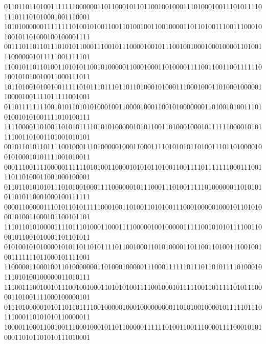 \documentclass[10pt,\tflang,dvips]{book}
\begin{document}
{{\begin{minipage}{\oldpwidth}
{{{{011011011010011111110000001101100010110110010010001110100010011101011110111011101010001001110001\\
101010000001111111101001010011001101001001100100001101101001110011100010100101101000100100001111\blue\\
001110110110111010101100011100101110000100101110010010001000100001101001110000001011111001111101\\
110010110110100110101011001010000011000100011010000111100110011001111110100101010010011000111011\blue\\
101101001010010011111010111011101101101000101000111000100011010001000001100001001111011111001001\\
011011111111001010110101010001001100001000110010100000001101001010011101010010101001111010100111\blue\\
111100001101001101010111101010100000101011001101000100010111111000010101111001101001101001010101\\
001011010110111100100011101000001000110001111010101011010011101101000010010100010101111001010011\blue\\
000111001111000001111110101001100001010101101001100111101111111000111001110110100011001000100001\\
011011010101011101010010001111000000101110001110100111110100000011010101011010110001000100111111\blue\\
000011000001110101101011111000100110100110101001110001000001000101101010001010011000101100101101\\
111011010100001111011101000110001111000001001000001111100101010111100110001011001010001101101011\blue\\
010100101010000101011011010111101100100011010100001101100110100111001001001111111011000101111001\\
110000011000100110100000001101000100000111000111111011101101011110100010111010100100000011010111\blue\\
111001110010010111001001000110101010011110010001011111001101111101011100001101001111000100000101\\
011101000001010110110111100100000100010000000001101010010000101111101110111000110101010110000011\blue\\
100001100011001001110001000101101100000111111010011001110000111100010101000110101101010111010001\\
}}}}
\end{minipage}}}
\end{document}
